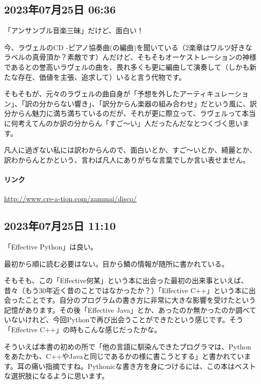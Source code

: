 \documentclass[facebook_diary.tex]{subfiles}
\begin{document}
\subsection*{2023年07月25日 06:36}

「アンサンブル音楽三昧」だけど、面白い！


今、ラヴェルのCD -ピアノ協奏曲(の編曲)を聞いている（2楽章はワルツ好きなラベルの真骨頂か？素敵です）んだけど、そもそもオーケストレーションの神様であるとの誉高いラヴェルの曲を、畏れ多くも更に編曲して演奏して（しかも新たな存在、価値を主張、追求して）いると言う代物です。

そもそもが、元々のラヴェルの曲自身が「予想を外したアーティキュレーション」、「訳の分からない響き」、「訳分からん楽器の組み合わせ」だという風に、訳分からん魅力に満ち満ちているのだが、それが更に際立って、ラヴェルって本当に何考えてんのか訳の分からん「すご〜い」人だったんだなとつくづく思います。


凡人に過ぎない私には訳わからんので、面白いとか、すご〜いとか、綺麗とか、訳わからんとかという、言わば凡人にありがちな言葉でしか言い表せません。

\paragraph{リンク}
\url{http://www.cre-a-tion.com/zammai/disco/}

\subsection*{2023年07月25日 11:10}

「Effective Python」は良い。


最初から順に読む必要はない。目から鱗の情報が随所に書かれている。

そもそも、この「Effective何某」という本に出会った最初の出来事といえば、昔々（もう30年近く昔のことではなかったか？）「Effective C++」という本に出会ったことです。自分のプログラムの書き方に非常に大きな影響を受けたという記憶があります。その後「Effective Java」とか、あったのか無かったのか調べていないけれど、今回Pythonで再び出会うことができたという感じです。そう「Effective C++」の時もこんな感じだったかな。

そういえば本書の初めの所で「他の言語に馴染んできたプログラマは、Pythonをあたかも、C++やJavaと同じであるかの様に書こうとする」と書かれています。耳の痛い指摘ですね。Pythonicな書き方を身につけるには、この本はベストな選択肢になるように思います。
\end{document}
